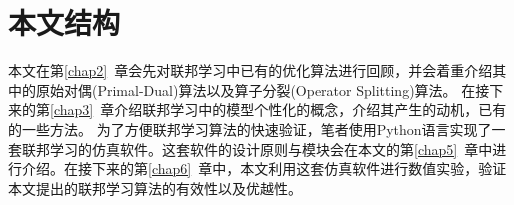\section{本文结构}
\label{sec:chap1-structure}


本文在第\ref{chap2}~章会先对联邦学习中已有的优化算法进行回顾，并会着重介绍其中的原始对偶(Primal-Dual)算法以及算子分裂(Operator Splitting)算法。
在接下来的第\ref{chap3}~章介绍联邦学习中的模型个性化的概念，介绍其产生的动机，已有的一些方法。
为了方便联邦学习算法的快速验证，笔者使用Python语言实现了一套联邦学习的仿真软件。这套软件的设计原则与模块会在本文的第\ref{chap5}~章中进行介绍。在接下来的第\ref{chap6}~章中，本文利用这套仿真软件进行数值实验，验证本文提出的联邦学习算法的有效性以及优越性。
